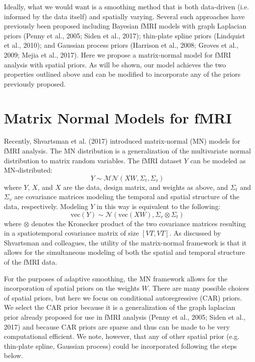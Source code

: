 \documentclass[9pt]{NEU560-final}
\begin{document}
Ideally, what we would want is a smoothing method that is both data-driven (i.e. informed by the data itself) and spatially varying. Several such approaches have previously been proposed including Bayesian fMRI models with graph Laplacian priors (Penny et al., 2005; Siden et al., 2017); thin-plate spline priors (Lindquist et al., 2010); and Gaussian process priors (Harrison et al., 2008; Groves et al., 2009; Mejia et al., 2017). Here we propose a matrix-normal model for fMRI analysis with spatial priors. As will be shown, our model achieves the two properties outlined above and can be modified to incorporate any of the priors previously proposed. 

\section{Matrix Normal Models for fMRI}
Recently, Shvartsman et al. (2017) introduced matrix-normal (MN) models for fMRI analysis. The MN distribution is a generalization of the multivariate normal distribution to matrix random variables. The fMRI dataset $Y$ can be modeled as MN-distributed: 
$$ Y \sim \mathcal{MN}(XW, \Sigma_t, \Sigma_v) $$
where $Y$, $X$, and $X$ are the data, design matrix, and weights as above, and $\Sigma_t$ and $\Sigma_v$ are covariance matrices modeling the temporal and spatial structure of the data, respectively. Modeling $Y$ in this way is equivalent to the following: 
$$ \text{vec}(Y) \sim \mathcal{N}(\text{vec}(XW), \Sigma_v \otimes \Sigma_t) $$
where $\otimes$ denotes the Kronecker product of the two covariance matrices resulting in a spatiotemporal covariance matrix of size $[VT, VT]$. As discussed by Shvartsman and colleagues, the utility of the matrix-normal framework is that it allows for the simultaneous modeling of both the spatial and temporal structure of the fMRI data.

For the purposes of adaptive smoothing, the MN framework allows for the incorporation of spatial priors on the weights $W$. There are many possible choices of spatial priors, but here we focus on conditional autoregressive (CAR) priors. We select the CAR prior because it is a generalization of the graph laplacian prior already proposed for use in fMRI analysis (Penny et al., 2005; Siden et al., 2017) and because CAR priors are sparse and thus can be made to be very computational efficient. We note, however, that any of other spatial prior (e.g. thin-plate spline, Gaussian process) could be incorporated following the steps below.
\end{document}

